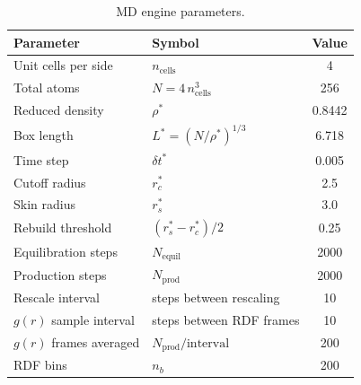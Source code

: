 \begin{table}[H]
    \centering
    \caption{MD engine parameters.}
    \label{tab:integrated_params}
    \begin{tabular}{llc}
        \toprule
        \textbf{Parameter} & \textbf{Symbol} & \textbf{Value} \\
        \midrule
        Unit cells per side      & $n_\text{cells}$                  & 4       \\
        Total atoms              & $N = 4\,n_\text{cells}^3$         & 256     \\
        Reduced density          & $\rho^*$                          & 0.8442  \\
        Box length               & $L^* = (N/\rho^*)^{1/3}$          & 6.718   \\
        Time step                & $\delta t^*$                      & 0.005   \\
        Cutoff radius            & $r_c^*$                           & 2.5     \\
        Skin radius              & $r_s^*$                           & 3.0     \\
        Rebuild threshold        & $(r_s^* - r_c^*)/2$               & 0.25    \\
        Equilibration steps      & $N_\text{equil}$                  & 2000    \\
        Production steps         & $N_\text{prod}$                   & 2000    \\
        Rescale interval         & steps between rescaling           & 10      \\
        $g(r)$ sample interval   & steps between RDF frames          & 10      \\
        $g(r)$ frames averaged   & $N_\text{prod} / \text{interval}$ & 200     \\
        RDF bins                 & $n_b$                             & 200     \\
        \bottomrule
    \end{tabular}
\end{table}

